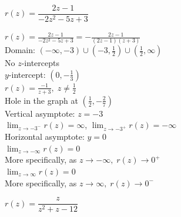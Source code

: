 \documentclass{ximera}
\begin{document}
\begin{question}
\begin{problem}
\begin{solution}
\begin{center} 
\end{center}
\end{solution}
\end{problem} 

\begin{problem}
$r(z) = \dfrac{2z - 1}{-2z^{2} - 5z + 3}$

\begin{solution}
$r(z) = \frac{2z - 1}{-2z^{2} - 5z + 3} = -\frac{2z - 1}{(2z - 1)(z + 3)}$\\
Domain: $(-\infty, -3) \cup (-3, \frac{1}{2}) \cup (\frac{1}{2}, \infty)$\\
No $z$-intercepts\\
$y$-intercept: $(0, -\frac{1}{3})$\\
$r(z) = \frac{-1}{z + 3}, \; z \neq \frac{1}{2}$\\
Hole in the graph at $(\frac{1}{2}, -\frac{2}{7})$\\
Vertical asymptote: $z = -3$\\
$\lim_{z \rightarrow -3^{-}} r(z) = \infty$, $\lim_{z \rightarrow -3^{+}} r(z) = -\infty$ \\
Horizontal asymptote: $y = 0$\\
$\lim_{z \rightarrow -\infty} r(z)  = 0$\\
More specifically, as $z \rightarrow -\infty, \; r(z) \rightarrow 0^{+}$\\
$\lim_{z \rightarrow \infty} r(z)  = 0$\\
More specifically, as $z \rightarrow \infty, \; r(z) \rightarrow 0^{-}$\\

\begin{center} 
\end{center}
\end{solution}
\end{problem}

\begin{problem}
$r(z) = \dfrac{z}{z^{2} + z - 12}$


\end{problem}
\end{question}
\end{document}
